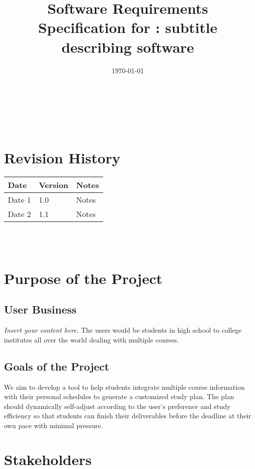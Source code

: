 \documentclass[12pt]{article}
\newcommand{\lips}{\textit{Insert your content here.}}
\begin{document}
\title{Software Requirements Specification for \progname: subtitle describing software} 
\author{\authname}
\date{\today}
	
\maketitle

~\newpage


\tableofcontents

~\newpage

\section*{Revision History}

\begin{tabularx}{\textwidth}{p{3cm}p{2cm}X}
\toprule {\textbf{Date}} & {\textbf{Version}} & {\textbf{Notes}}\\
\midrule
Date 1 & 1.0 & Notes\\
Date 2 & 1.1 & Notes\\
\bottomrule
\end{tabularx}

~\\

~\newpage
\section{Purpose of the Project}
\subsection{User Business}
\lips
The users would be students in high school to college institutes all over the world dealing with multiple courses.

\subsection{Goals of the Project}
We aim to develop a tool to help students integrate multiple course information with their personal schedules to generate a customized study plan. The plan should dynamically self-adjust according to the user's preference and study efficiency so that students can finish their deliverables before the deadline at their own pace with minimal pressure.
\section{Stakeholders}
\end{document}
